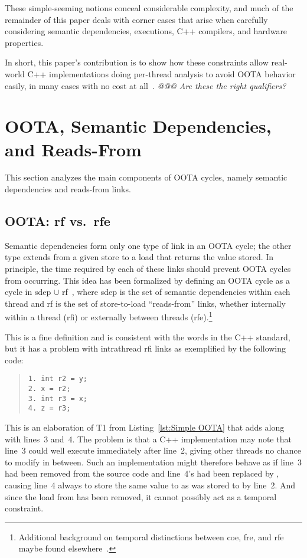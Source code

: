 These simple-seeming notions conceal considerable complexity,
and much of the remainder of this paper deals with corner cases that
arise when carefully considering semantic dependencies, executions, C++
compilers, and hardware properties.

In short, this paper's contribution is to show how these
constraints allow real-world C++ implementations doing per-thread
analysis to avoid OOTA behavior easily,
in many cases with no cost at
all~\cite{PaulEMcKenney2023P3046R2/OOTAwithoutTrying}.
\emph{@@@ Are these the right qualifiers?}

\section{OOTA, Semantic Dependencies, and Reads-From}
\label{sec:OOTA, Semantic Dependencies, and Reads-From}

This section analyzes the main components of OOTA cycles, namely
semantic dependencies and reads-from links.

\subsection{OOTA: rf vs.\ rfe}
\label{sec:OOTA: rf vs. rfe}

Semantic dependencies form only one type of link in an OOTA cycle;
the other type extends from a given store to a load that returns the
value stored.
In principle, the time required by each of these links should prevent
OOTA cycles from occurring.
This idea has been formalized by defining an OOTA cycle as a cycle
in sdep $\cup$ rf~\cite{PaulEMcKenney2014OOTA},
where sdep is the set of semantic dependencies within each thread and
rf is the set of store-to-load ``reads-from'' links, whether internally
within a thread (rfi) or externally between threads (rfe).\footnote{
	Additional background on temporal distinctions between coe, fre,
	and rfe maybe found elsewhere~\cite[Appendix A]{PaulEMcKenney2023P3046R2/OOTAwithoutTrying}.}

This is a fine definition and is consistent with the words in the C++
standard, but it has a problem with intrathread rfi links
as exemplified by the following code:
\begin{quote}
\begin{verbatim}
1. int r2 = y;
2. x = r2;
3. int r3 = x;
4. z = r3;
\end{verbatim}
\end{quote}
This is an elaboration of T1 from
Listing~\ref{lst:Simple OOTA}
that adds  along with lines~3 and~4.
The problem is that a C++ implementation may
note that line~3 could well execute immediately after line~2, giving
other threads no chance to modify  in between.
Such an implementation might therefore behave as if line~3 had been
removed from the source code and line~4's  had been replaced by
,
causing line~4 always to store the same value to  as was stored
to  by line~2.
And since the load from  has been removed, it cannot possibly
act as a temporal constraint.

